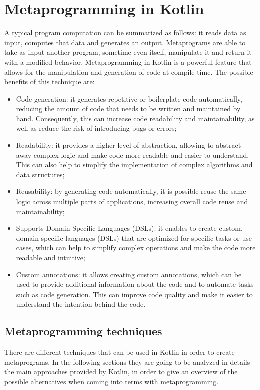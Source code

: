 \chapter{Metaprogramming in Kotlin}\label{chapter:metaprogramming}
A typical program computation can be summarized as follows: it reads data as input, computes that data and generates an output. Metaprograms \cite{metaprogramming_introduction} are able to take as input another program, sometime even itself, manipulate it and return it with a modified behavior.\newline
Metaprogramming in Kotlin is a powerful feature that allows for the manipulation and generation of code at compile time. The possible benefits of this technique are:
\begin{itemize}
    \item Code generation: it generates repetitive or boilerplate code automatically, reducing the amount of code that needs to be written and maintained by hand. Consequently, this can increase code readability and maintainability, as well as reduce the risk of introducing bugs or errors;
    \item Readability: it provides a higher level of abstraction, allowing to abstract away complex logic and make code more readable and easier to understand. This can also help to simplify the implementation of complex algorithms and data structures;
    \item Reusability: by generating code automatically, it is possible reuse the same logic across multiple parts of applications, increasing overall code reuse and maintainability;
    \item Supports Domain-Specific Languages (DSLs): it enables to create custom, domain-specific languages (DSLs) that are optimized for specific tasks or use cases, which can help to simplify complex operations and make the code more readable and intuitive;
    \item Custom annotations: it allows creating custom annotations, which can be used to provide additional information about the code and to automate tasks such as code generation. This can improve code quality and make it easier to understand the intention behind the code.
\end{itemize}

\section{Metaprogramming techniques}
There are different techniques that can be used in Kotlin in order to create metaprograms. In the following sections they are going to be analyzed in details the main approaches provided by Kotlin, in order to give an overview of the possible alternatives when coming into terms with metaprogramming.

